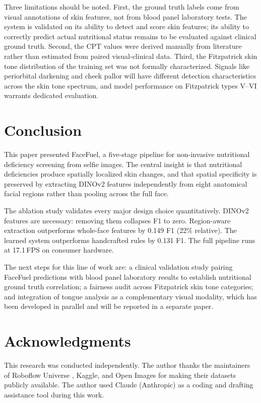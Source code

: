 \documentclass[journal]{IEEEtran}
\begin{document}
Three limitations should be noted. First, the ground truth labels come from
visual annotations of skin features, not from blood panel laboratory tests.
The system is validated on its ability to detect and score skin features;
its ability to correctly predict actual nutritional status remains to be
evaluated against clinical ground truth. Second, the CPT values were derived
manually from literature rather than estimated from paired visual-clinical data.
Third, the Fitzpatrick skin tone distribution of the training set was not
formally characterized. Signals like periorbital darkening and cheek pallor
will have different detection characteristics across the skin tone spectrum,
and model performance on Fitzpatrick types V--VI warrants dedicated evaluation.

\section{Conclusion}
\label{sec:conclusion}

This paper presented FaceFuel, a five-stage pipeline for non-invasive
nutritional deficiency screening from selfie images. The central insight is that
nutritional deficiencies produce spatially localized skin changes, and that spatial
specificity is preserved by extracting DINOv2 features independently from eight
anatomical facial regions rather than pooling across the full face.

The ablation study validates every major design choice quantitatively.
DINOv2 features are necessary: removing them collapses F1 to zero.
Region-aware extraction outperforms whole-face features by 0.149 F1 (22\% relative).
The learned system outperforms handcrafted rules by 0.131 F1.
The full pipeline runs at 17.1\,FPS on consumer hardware.

The next steps for this line of work are: a clinical validation study pairing
FaceFuel predictions with blood panel laboratory results to establish nutritional
ground truth correlation; a fairness audit across Fitzpatrick skin tone categories;
and integration of tongue analysis as a complementary visual modality, which has
been developed in parallel and will be reported in a separate paper.

\section*{Acknowledgments}

This research was conducted independently. The author thanks the maintainers
of Roboflow Universe \cite{roboflow2023}, Kaggle, and Open Images for making
their datasets publicly available. The author used Claude (Anthropic) as a
coding and drafting assistance tool during this work.



\end{document}
